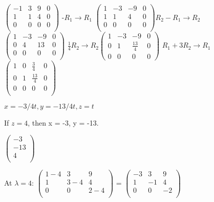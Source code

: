 \documentclass[12pt]{article}
\begin{document}
\begin{enumerate}
            $\begin{pmatrix}
                -1 & 3 & 9 & 0\\
                1 & 1 & 4 & 0\\
                0 & 0 & 0 & 0\\
            \end{pmatrix}$ -$R_1 \xrightarrow{} R_1$ $\begin{pmatrix}
                1 & -3 & -9 & 0\\
                1 & 1 & 4 & 0\\
                0 & 0 & 0 & 0\\
            \end{pmatrix} R_2 - R_1 \xrightarrow{} R_2$ $\begin{pmatrix}
                1 & -3 & -9 & 0\\
                0 & 4 & 13 & 0\\
                0 & 0 & 0 & 0\\
            \end{pmatrix}$ $\frac{1}{4}R_2 \xrightarrow{} R_2 \begin{pmatrix}
                1 & -3 & -9 & 0 \\
                0 & 1 & \frac{13}{4} & 0 \\
                0 & 0 & 0 & 0
            \end{pmatrix}$ $R_1 + 3R_2 \xrightarrow{} R_1$ $\begin{pmatrix}
                1 & 0 & \frac{3}{4} & 0\\
                0 & 1 & \frac{13}{4} & 0\\
                0 & 0 & 0 & 0\\
            \end{pmatrix}$

            $x = -3/4t, y = -13/4t, z = t$
            
            If $z = 4$, then x = -3, y = -13. 
            
            $\begin{pmatrix}
                -3 \\
                -13\\
                4 \\
            \end{pmatrix}$

        At $\lambda = 4$: 
        $\begin{pmatrix}
                1 - 4 & 3 & 9 \\
                1 & 3 - 4 & 4 \\
                0 & 0 & 2 - 4\\
            \end{pmatrix}$ = $\begin{pmatrix}
                -3 & 3 & 9 \\
                1 & -1 & 4 \\
                0 & 0 & -2\\
            \end{pmatrix}$


\end{enumerate}
\end{document}
